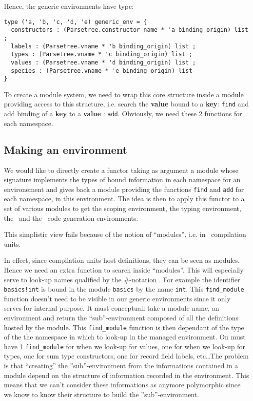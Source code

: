 Hence, the generic environments have type:
{\scriptsize
\begin{lstlisting}[language=MyOCaml]
type ('a, 'b, 'c, 'd, 'e) generic_env = {
  constructors : (Parsetree.constructor_name * 'a binding_origin) list ;
  labels : (Parsetree.vname * 'b binding_origin) list ;
  types : (Parsetree.vname * 'c binding_origin) list ;
  values : (Parsetree.vname * 'd binding_origin) list ;
  species : (Parsetree.vname * 'e binding_origin) list
}
\end{lstlisting}
}

To create a module system, we need to wrap this core structure inside
a module providing access to this structure, i.e. search the
{\bf value} bound to a {\bf key}: {\tt find} and add binding of a
{\bf key} to a {\bf value} : {\tt add}. Obviously, we need these 2
functions for each namespace.



\subsection{Making an environment}
We would like to directly create a functor taking as argument a module
whose signature implements the types of bound information in each
namespace for an environement and gives back a module providing the
functions {\tt find} and {\tt add} for each namespace, in this
environment. The idea is then to apply this functor to a set of
various modules to get the scoping environment, the typing
environment, the \ocaml\ and the \coq\ code generation environments.

This simplistic view fails because of the notion of ``modules'',
i.e. in \focalize\, compilation units.

In effect, since compilation units host definitions, they can be seen
as modules. Hence we need an extra function to search inside
``modules''. This will especially serve to look-up names qualified by
the \#-notation . For example the identifier {\tt basics!int} is bound
in the module {\tt basics} by the name {\tt int}. This
{\tt find\_module} function doesn't need to be visible in our generic
environments since it only serves for internal purpose. It must
conceptuall take a module name, an environment and return the
``sub''-environment composed of all the definitions hosted by the
module. This {\tt find\_module} function is then dependant of the type
of the the namespace in which to look-up in the managed environment.
On must have 1 {\tt find\_module} for when we look-up for values, one
for when we look-up for types, one for sum type constructors, one for
record field labels, etc\ldots The problem is that ``creating'' the
''sub''-environment from the informations contained in a module
depend on the structure of information recorded in the environment.
This means that we can't consider these informations as anymore
polymorphic since we know to know their structure to build the
''sub''-environment.

